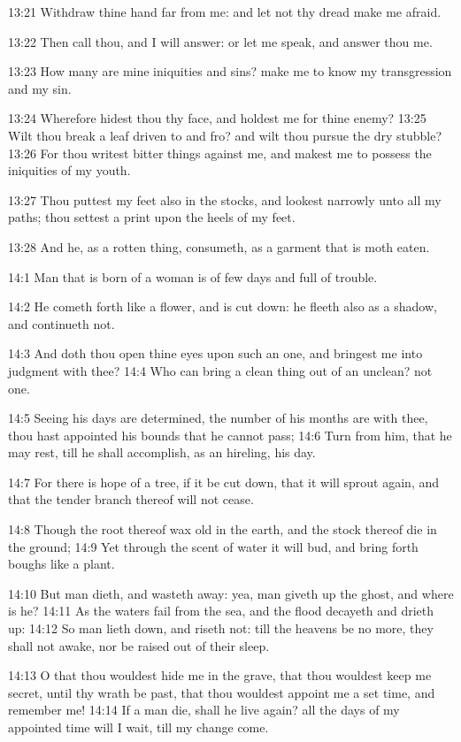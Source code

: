 13:21 Withdraw thine hand far from me: and let not thy dread make me afraid.

13:22 Then call thou, and I will answer: or let me speak, and answer thou me.

13:23 How many are mine iniquities and sins? make me to know my transgression and my sin.

13:24 Wherefore hidest thou thy face, and holdest me for thine enemy?  13:25 Wilt thou break a leaf driven to and fro? and wilt thou pursue the dry stubble?  13:26 For thou writest bitter things against me, and makest me to possess the iniquities of my youth.

13:27 Thou puttest my feet also in the stocks, and lookest narrowly unto all my paths; thou settest a print upon the heels of my feet.

13:28 And he, as a rotten thing, consumeth, as a garment that is moth eaten.

14:1 Man that is born of a woman is of few days and full of trouble.

14:2 He cometh forth like a flower, and is cut down: he fleeth also as a shadow, and continueth not.

14:3 And doth thou open thine eyes upon such an one, and bringest me into judgment with thee?  14:4 Who can bring a clean thing out of an unclean? not one.

14:5 Seeing his days are determined, the number of his months are with thee, thou hast appointed his bounds that he cannot pass; 14:6 Turn from him, that he may rest, till he shall accomplish, as an hireling, his day.

14:7 For there is hope of a tree, if it be cut down, that it will sprout again, and that the tender branch thereof will not cease.

14:8 Though the root thereof wax old in the earth, and the stock thereof die in the ground; 14:9 Yet through the scent of water it will bud, and bring forth boughs like a plant.

14:10 But man dieth, and wasteth away: yea, man giveth up the ghost, and where is he?  14:11 As the waters fail from the sea, and the flood decayeth and drieth up: 14:12 So man lieth down, and riseth not: till the heavens be no more, they shall not awake, nor be raised out of their sleep.

14:13 O that thou wouldest hide me in the grave, that thou wouldest keep me secret, until thy wrath be past, that thou wouldest appoint me a set time, and remember me!  14:14 If a man die, shall he live again?  all the days of my appointed time will I wait, till my change come.

